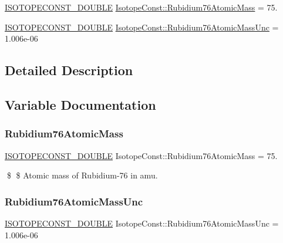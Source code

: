 \begin{DoxyCompactItemize}
\item 
\mbox{\hyperlink{group___isotope_const-_macros_ga8f45a7272ce02c0b4c65c44636ed719a}{I\+S\+O\+T\+O\+P\+E\+C\+O\+N\+S\+T\+\_\+\+D\+O\+U\+B\+LE}} \mbox{\hyperlink{group___isotope_const-_rubidium-_rb76_ga0016a7d2424da029cd460262dd17d675}{Isotope\+Const\+::\+Rubidium76\+Atomic\+Mass}} = 75.
\item 
\mbox{\hyperlink{group___isotope_const-_macros_ga8f45a7272ce02c0b4c65c44636ed719a}{I\+S\+O\+T\+O\+P\+E\+C\+O\+N\+S\+T\+\_\+\+D\+O\+U\+B\+LE}} \mbox{\hyperlink{group___isotope_const-_rubidium-_rb76_ga984937c76af7ba58e4aa312e4017d629}{Isotope\+Const\+::\+Rubidium76\+Atomic\+Mass\+Unc}} = 1.\+006e-\/06
\end{DoxyCompactItemize}


\subsection{Detailed Description}


\subsection{Variable Documentation}
\mbox{\label{group___isotope_const-_rubidium-_rb76_ga0016a7d2424da029cd460262dd17d675}} 
\subsubsection{\texorpdfstring{Rubidium76\+Atomic\+Mass}{Rubidium76AtomicMass}}
{\footnotesize\ttfamily \mbox{\hyperlink{group___isotope_const-_macros_ga8f45a7272ce02c0b4c65c44636ed719a}{I\+S\+O\+T\+O\+P\+E\+C\+O\+N\+S\+T\+\_\+\+D\+O\+U\+B\+LE}} Isotope\+Const\+::\+Rubidium76\+Atomic\+Mass = 75.}

\$ \$ Atomic mass of Rubidium-\/76 in amu. \mbox{\label{group___isotope_const-_rubidium-_rb76_ga984937c76af7ba58e4aa312e4017d629}} 
\subsubsection{\texorpdfstring{Rubidium76\+Atomic\+Mass\+Unc}{Rubidium76AtomicMassUnc}}
{\footnotesize\ttfamily \mbox{\hyperlink{group___isotope_const-_macros_ga8f45a7272ce02c0b4c65c44636ed719a}{I\+S\+O\+T\+O\+P\+E\+C\+O\+N\+S\+T\+\_\+\+D\+O\+U\+B\+LE}} Isotope\+Const\+::\+Rubidium76\+Atomic\+Mass\+Unc = 1.\+006e-\/06}

